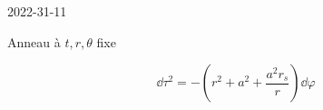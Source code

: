 


2022-31-11

\begin{tcolorbox}[title=commentaire sur les courbes de genre temps fermées]

Anneau à $t, r, \theta$ fixe

\[ \dd \tau ^2 =  - \left( r^{2} +a^{2} + \frac{a^{2} r_s }{r}  \right) \dd \varphi   \] 
	 
\end{tcolorbox}



